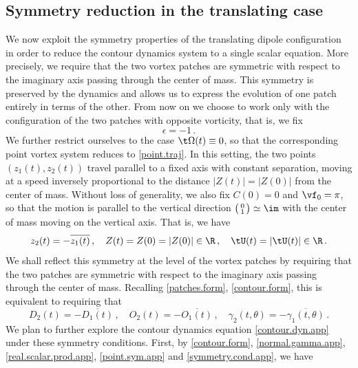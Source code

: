 \documentclass[a4paper,reqno,10pt]{article}
\begin{document}
\subsection{Symmetry reduction in the translating case}
We now exploit the symmetry properties of the translating dipole configuration in order to reduce the contour dynamics system to a single scalar equation. More precisely, we require that the two vortex patches are symmetric with respect to the imaginary axis passing through the center of mass. This symmetry is preserved by the dynamics and allows us to express the evolution of one patch entirely in terms of the other.
From now on we choose to work only with   the configuration  of the two patches with opposite vorticity, that is, we fix
\begin{equation}
	\epsilon = -1\,.
\end{equation}
We further restrict ourselves to the case $\t\Omega(t)\equiv 0$, so that the corresponding point vortex system reduces to \eqref{point.traj}. In this setting, the two points $(z_1(t),z_2(t))$ travel parallel to a fixed axis with constant separation, moving at a speed inversely proportional to the distance $|Z(t)|=|Z(0)|$ from the center of mass.
 Without loss of generality, we also fix $C(0)=0$ and $\vf_{0}=\pi$, so that the motion is parallel to the vertical direction $\big(\begin{smallmatrix}
	0 \\ 1
\end{smallmatrix}\big)\simeq \im$ with the center of mass moving on the vertical axis. That is, we have
\begin{equation}\label{point.sym.app}
	z_2(t) = - \overline{z_1(t)} \,, \quad Z(t) = Z(0) = |Z(0)| \in \R\,, \quad \tU(t)=|\tU(t)|\in\R\,.
\end{equation}
We shall reflect this symmetry at the level of the vortex patches by requiring that the two patches are symmetric with respect to the imaginary axis passing through the center of mass.
Recalling \eqref{patches.form}, \eqref{contour.form},  this is equivalent to requiring that
  \begin{equation}\label{symmetry.cond.app}
  	D_2(t) = - \overline{D_1(t)} \,, \quad O_2(t) = -\overline{O_1(t)}\,, \quad \gamma_{2}(t,\theta) = - \overline{\gamma_{1}(t,\theta)} \,.
   \end{equation}
   We plan to further explore the contour dynamics equation \eqref{contour.dyn.app} under these symmetry conditions. First, by \eqref{contour.form}, \eqref{normal.gamma.app}, \eqref{real.scalar.prod.app}, \eqref{point.sym.app} and \eqref{symmetry.cond.app}, we have
\end{document}
